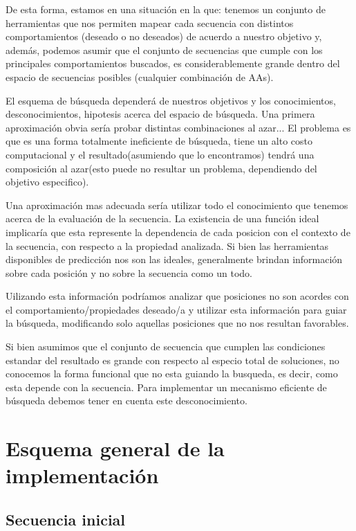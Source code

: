 De esta forma, estamos en una situación en la que: tenemos un conjunto de herramientas que nos permiten mapear cada secuencia con distintos comportamientos (deseado o no deseados) de acuerdo a nuestro objetivo y, además, 
podemos asumir que el conjunto de secuencias que cumple con los principales comportamientos buscados, es considerablemente grande dentro del espacio de secuencias posibles (cualquier combinación de AAs).

El esquema de búsqueda dependerá de nuestros objetivos y los conocimientos, desconocimientos, hipotesis acerca del espacio de búsqueda.
Una primera aproximación obvia sería probar distintas combinaciones al azar...
El problema es que es una forma totalmente ineficiente de búsqueda, tiene un alto costo computacional y el resultado(asumiendo que lo encontramos) tendrá una composición al azar(esto puede no resultar un problema, dependiendo del objetivo especifico).

Una aproximación mas adecuada sería utilizar todo el conocimiento que tenemos acerca de la evaluación de la secuencia. 
La existencia de una función ideal implicaría que esta represente la dependencia de cada posicion con el contexto de la secuencia, con respecto a la propiedad analizada.
Si bien las herramientas disponibles de predicción nos son las ideales, generalmente brindan información sobre cada posición y no sobre la secuencia como un todo.

Uilizando esta información podríamos analizar que posiciones no son acordes con el comportamiento/propiedades deseado/a y utilizar esta información para guiar la búsqueda, modificando solo aquellas posiciones que no nos resultan favorables.
 
Si bien asumimos que el conjunto de secuencia que cumplen las condiciones estandar del resultado es grande con respecto al especio total de soluciones, no conocemos la forma funcional que no esta guiando la busqueda,
es decir, como esta depende con la secuencia.  Para implementar un mecanismo eficiente de búsqueda debemos tener en cuenta este desconocimiento.




\section{Esquema general de la implementación}




\subsection{Secuencia inicial}

